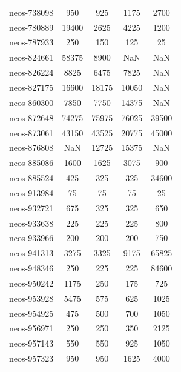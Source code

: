 \begin{longtable}{lcccc}
neos-738098                 &      950 &      925 &     1175 &  2700 \\
neos-780889                 &    19400 &     2625 &     4225 &  1200 \\
neos-787933                 &      250 &      150 &      125 &    25 \\
neos-824661                 &    58375 &     8900 &      NaN &   NaN \\
neos-826224                 &     8825 &     6475 &     7825 &   NaN \\
neos-827175                 &    16600 &    18175 &    10050 &   NaN \\
neos-860300                 &     7850 &     7750 &    14375 &   NaN \\
neos-872648                 &    74275 &    75975 &    76025 & 39500 \\
neos-873061                 &    43150 &    43525 &    20775 & 45000 \\
neos-876808                 &      NaN &    12725 &    15375 &   NaN \\
neos-885086                 &     1600 &     1625 &     3075 &   900 \\
neos-885524                 &      425 &      325 &      325 & 34600 \\
neos-913984                 &       75 &       75 &       75 &    25 \\
neos-932721                 &      675 &      325 &      325 &   650 \\
neos-933638                 &      225 &      225 &      225 &   800 \\
neos-933966                 &      200 &      200 &      200 &   750 \\
neos-941313                 &     3275 &     3325 &     9175 & 65825 \\
neos-948346                 &      250 &      225 &      225 & 84600 \\
neos-950242                 &     1175 &      250 &      175 &   725 \\
neos-953928                 &     5475 &      575 &      625 &  1025 \\
neos-954925                 &      475 &      500 &      700 &  1050 \\
neos-956971                 &      250 &      250 &      350 &  2125 \\
neos-957143                 &      550 &      550 &      925 &  1050 \\
neos-957323                 &      950 &      950 &     1625 &  4000 \\

\end{longtable}
